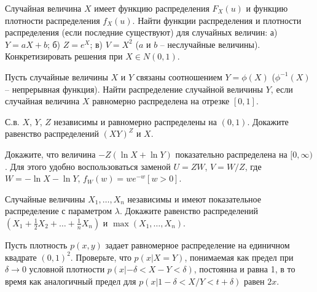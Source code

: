 \begin{problem}
Случайная величина $X$ имеет функцию распределения $F_X(u)$ и функцию плотности распределения $f_X(u)$. Найти функции распределения и плотности распределения (если последние существуют) для случайных величин: а) $Y = aX+b$; б) $Z =e^X$; в) $V = X^2$ ($a$ и $b$ – неслучайные величины). Конкретизировать решения при $X \in N(0,1)$.
\end{problem}

\begin{problem}
Пусть случайные величины $X$ и $Y$ связаны соотношением $Y = \phi(X)$ ($\phi^{-1}(X)$ – непрерывная функция). Найти распределение случайной величины $Y$, если случайная величина $X$ равномерно распределена на отрезке $[0,1]$.
\end{problem}

\begin{problem}
С.в. $X$, $Y$, $Z$ независимы и равномерно распределены на $(0,1)$. Докажите равенство распределений  $(XY)^{Z}$  и $X$.
\end{problem}

\begin{ordre}
Докажите, что величина $-Z(\ln X + \ln Y)$ показательно распределена на $[0,\infty)$. Для этого удобно воспользоваться заменой $U = Z W$, $V = W/Z$, где $W = - \ln X - \ln Y$, $f_W(w) = w e^{-w} [w>0]$. 
\end{ordre}

\begin{problem}
Случайные величины $X_1,\ldots,X_n$ независимы и имеют показательное распределение с параметром $\lambda$.
Докажите равенство распределений $(X_1+  \frac{1}{2} X_2 + \ldots+ \frac{1}{n} X_n)$ и  $\max(X_1,\ldots,X_n)$.
\end{problem}


\begin{problem}[А.Н. Соболевский]
Пусть плотность $p(x,y)$ задает равномерное распределение на единичном квадрате $(0, 1)^2$. Проверьте, что $p(x | X = Y )$, понимаемая как предел при $\delta \to 0$ условной плотности $p(x | -\delta < X - Y <  \delta)$, постоянна и равна 1, в то время как аналогичный предел для $p (x | 1 - \delta < X/Y < t + \delta)$ равен $2x$. 
\end{problem}




